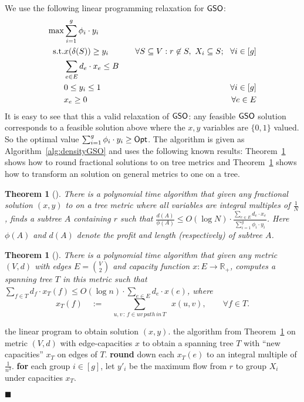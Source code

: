 \documentclass[11pt]{article}
\newtheorem{theorem}[thm]{Theorem}
\def\sse{\subseteq}
\def\opt{{\sf Opt}\xspace}
\newcommand{\profit}{\phi}
\def\gso{\ensuremath{{\sf GSO}}\xspace}
\newenvironment{pf}{

\noindent{\bf Proof:}} {\hfill$\blacksquare$


}
\begin{document}
\begin{pf}
We use the following linear programming relaxation \lpgo for \gso:
      \begin{eqnarray}
        \max & \sum_{i=1}^g  \profit_i\cdot y_i & 
         \label{lp:gso}\\
        \mbox{s.t.}& x(\delta(S))\ge y_i& \quad \forall S\sse V : r\not\in S,~X_i\sse S;~~\forall i\in[g] \notag \\
        &\sum_{e\in E} d_e\cdot x_e \le B&\notag \\
        & 0\le y_i\le 1 & \quad \forall i\in [g]\notag \\
        & x_e\ge 0& \quad \forall e\in E\notag 
      \end{eqnarray}
It is easy to see that this a valid relaxation of \gso: any feasible \gso solution corresponds to a feasible solution above where the $x,y$ variables are $\{0,1\}$ valued. So the optimal value $\sum_{i=1}^g  \profit_i\cdot y_i \ge \opt$. The algorithm is given as Algorithm~\ref{alg:densityGSO} and uses the following known results: Theorem~\ref{thm:ccgg} shows how to round fractional solutions to \lpgo on tree metrics and Theorem~\ref{thm:frt} shows how to transform an \lpgo solution on general metrics to one on a tree. 
\begin{theorem}[\cite{ccgg}]\label{thm:ccgg}
There is a polynomial time algorithm that given any fractional solution $(x,y)$ to \lpgo on a tree metric where all variables are integral multiples of $\frac{1}{N}$, finds a subtree $A$ containing $r$ such that $\frac{d(A)}{\profit(A)}\le O(\log N)\cdot \frac{\sum_{e\in E} d_e\cdot x_e}{\sum_{i=1}^g \profit_i\cdot y_i}$. Here  $\profit(A)$ and $d(A)$ denote the profit and length (respectively) of subtree $A$.
\end{theorem}


\begin{theorem}[\cite{FRT03}]\label{thm:frt} There is a polynomial time algorithm that given any metric $(V,d)$ with edges $E={V\choose 2}$ and capacity function $x:E\rightarrow\mathbb{R}_+$, computes a spanning tree $T$ in this metric such that $\sum_{f\in T} d_f\cdot x_T(f) \le O(\log n)\cdot \sum_{e\in E} d_e\cdot x(e)$, where
$$x_T(f)\quad :=\quad \sum_{u,v \,:\, f\in uv\, path\, in\, T}\,\,\, x(u,v),\qquad \forall f\in T.$$
\end{theorem}



\begin{algorithm}[!h]
  \caption{Algorithm for \gso maximizing profit-to-length ratio.}
\label{alg:densityGSO}
\begin{algorithmic}[1]
     the linear program \lpgo to obtain solution $(x,y)$.
     the algorithm from Theorem~\ref{thm:frt} on metric $(V,d)$ with edge-capacities $x$ to obtain a spanning tree $T$ with ``new capacities'' $x_T$ on edges of $T$. 
 \STATE \label{step:gso-round} {\bf round} down each $x_T(e)$ to an integral multiple of $\frac1{n^3}$.
    \STATE \label{step:gso-flow} {\bf for} each group $i\in[g]$, let $y'_i$ be
      the maximum flow from $r$ to group $X_i$ under  
      capacities $x_T$.
      

\end{algorithmic}
\end{algorithm}
\end{pf}
\end{document}
